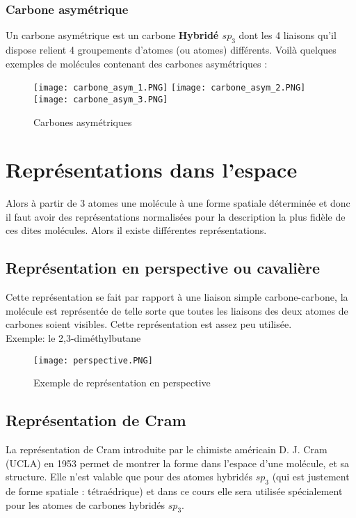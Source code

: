 \documentclass[a4paper, oneside]{book}
\begin{document}
\subsection{Carbone asymétrique}
Un carbone asymétrique est un carbone \textbf{Hybridé $sp_3$} dont les 4 liaisons qu'il dispose relient 4 groupements d'atomes (ou atomes) différents. Voilà quelques exemples de molécules contenant des carbones asymétriques :
\begin{figure}[!ht]
    \centering
    \texttt{[image: carbone\_asym\_1.PNG]}
    \texttt{[image: carbone\_asym\_2.PNG]}
    \texttt{[image: carbone\_asym\_3.PNG]}
    \caption{Carbones asymétriques}
    \label{fig:my_label}
\end{figure}

\chapter{Représentations dans l'espace}
\minitoc
Alors à partir de 3 atomes une molécule à une forme spatiale déterminée et donc il faut avoir des représentations normalisées pour la description la plus fidèle de ces dites molécules. Alors il existe différentes représentations.
\section{Représentation en perspective ou cavalière}
Cette représentation se fait par rapport à une liaison simple carbone-carbone, la molécule est représentée de telle sorte que toutes les liaisons des deux atomes de carbones soient visibles. Cette représentation est assez peu utilisée.\\
Exemple: le  2,3-diméthylbutane\\
\begin{figure}[!h]
    \centering
    \texttt{[image: perspective.PNG]}
    \caption{Exemple de représentation en perspective}
    \label{fig:my_label}
\end{figure}
\section{Représentation de Cram}
La représentation de Cram introduite par le chimiste américain D. J. Cram (UCLA) en 1953 permet de montrer la forme dans l'espace d'une molécule, et sa structure. Elle n'est valable que pour des atomes hybridés $sp_3$ (qui est justement de forme spatiale : tétraédrique) et dans ce cours elle sera utilisée spécialement pour les atomes de carbones hybridés $sp_3$.
\end{document}
